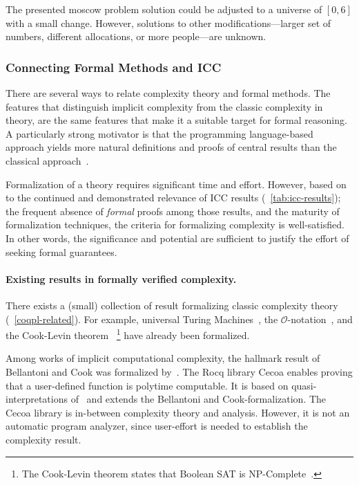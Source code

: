 The presented moscow problem solution could be adjusted to a universe of \([0, 6]\) with a small change.
However, solutions to other modifications---\eg larger set of numbers, different allocations, or more people---are unknown.

\subsubsection{Connecting Formal Methods and ICC}
\label{icc-formally}

There are several ways to relate complexity theory and formal methods.
The features that distinguish implicit complexity from the classic complexity in theory, are the same features that make it a suitable target for formal reasoning.
A particularly strong motivator is that the programming language-based approach yields more natural definitions and proofs of central results than the classical approach~\cite{kristiansen2017}.

Formalization of a theory requires significant time and effort.
However, based on to the continued and demonstrated relevance of ICC results (\cf~\autoref{tab:icc-results});
the frequent absence of \emph{formal} proofs among those results, and the maturity of formalization techniques, the criteria for formalizing complexity is well-satisfied.
In other words, the significance and potential are sufficient to justify the effort of seeking formal guarantees.

\paragraph*{Existing results in formally verified complexity.}
There exists a (small) collection of result formalizing classic complexity theory (\cf~\autoref{coqpl-related}).
For example, universal Turing Machines~\cite{forster2020}, the \(\mathcal{O}\)-notation~\cite{gueneau2018},
and the Cook-Levin theorem~\cite{gaher2021}%
\footnote{The Cook-Levin theorem states that Boolean SAT is NP-Complete~\cite{cook1971, levin1973}.}
have already been formalized.

Among works of implicit computational complexity, the hallmark result of Bellantoni and Cook was formalized by~\textcite{heraud2011}.
The Rocq library Cecoa enables proving that a user-defined function is polytime computable.
It is based on quasi-interpretations of~\textcite{marion2000} and extends the Bellantoni and Cook-formalization.
The Cecoa library is in-between complexity theory and analysis.
However, it is not an automatic program analyzer, since user-effort is needed to establish the complexity result.


